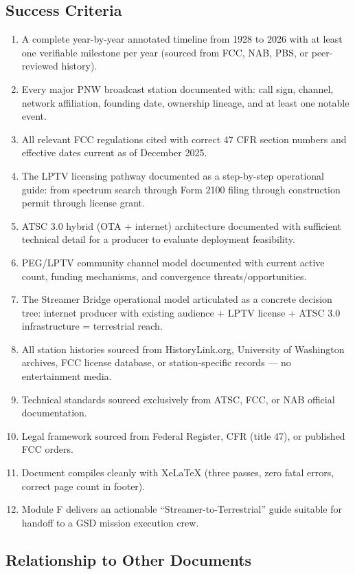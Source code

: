 \documentclass[11pt,letterpaper]{article}
\begin{document}
\subsection{Success Criteria}

\begin{enumerate}
  \item A complete year-by-year annotated timeline from 1928 to 2026 with at least one verifiable milestone per year (sourced from FCC, NAB, PBS, or peer-reviewed history).
  \item Every major PNW broadcast station documented with: call sign, channel, network affiliation, founding date, ownership lineage, and at least one notable event.
  \item All relevant FCC regulations cited with correct 47 CFR section numbers and effective dates current as of December 2025.
  \item The LPTV licensing pathway documented as a step-by-step operational guide: from spectrum search through Form 2100 filing through construction permit through license grant.
  \item ATSC 3.0 hybrid (OTA + internet) architecture documented with sufficient technical detail for a producer to evaluate deployment feasibility.
  \item PEG/LPTV community channel model documented with current active count, funding mechanisms, and convergence threats/opportunities.
  \item The Streamer Bridge operational model articulated as a concrete decision tree: internet producer with existing audience + LPTV license + ATSC 3.0 infrastructure = terrestrial reach.
  \item All station histories sourced from HistoryLink.org, University of Washington archives, FCC license database, or station-specific records --- no entertainment media.
  \item Technical standards sourced exclusively from ATSC, FCC, or NAB official documentation.
  \item Legal framework sourced from Federal Register, CFR (title 47), or published FCC orders.
  \item Document compiles cleanly with XeLaTeX (three passes, zero fatal errors, correct page count in footer).
  \item Module F delivers an actionable ``Streamer-to-Terrestrial'' guide suitable for handoff to a GSD mission execution crew.
\end{enumerate}

\subsection{Relationship to Other Documents}
\end{document}
